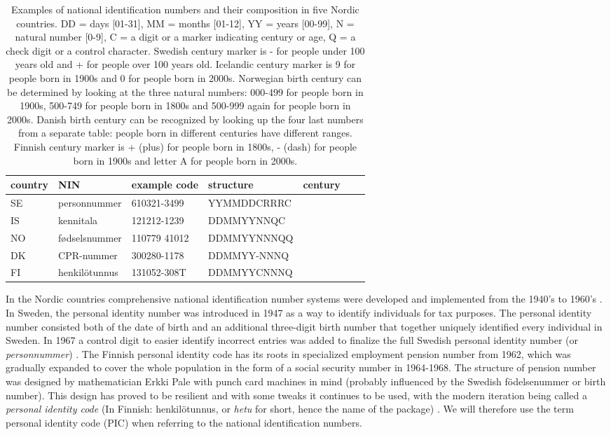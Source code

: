 \begin{table}[ht]
\centering
\begin{tabular}{lllllll}
\toprule
  country & NIN & example code & structure & century \\
  \hline
  SE & personnummer & 610321-3499 & YYMMDDCRRRC \\
  IS & kennitala & 121212-1239 & DDMMYYNNQC \\
  NO & fødselsnummer & 110779 41012 & DDMMYYNNNQQ \\
  DK & CPR-nummer & 300280-1178 & DDMMYY-NNNQ \\
  FI & henkilötunnus & 131052-308T & DDMMYYCNNNQ \\
\bottomrule
\end{tabular}
\caption{Examples of national identification numbers and their composition in five Nordic countries. DD = days [01-31], MM = months [01-12], YY = years [00-99], N = natural number [0-9], C = a digit or a marker indicating century or age, Q = a check digit or a control character. Swedish century marker is - for people under 100 years old and + for people over 100 years old. Icelandic century marker is 9 for people born in 1900s and 0 for people born in 2000s. Norwegian birth century can be determined by looking at the three natural numbers: 000-499 for people born in 1900s, 500-749 for people born in 1800s and 500-999 again for people born in 2000s. Danish birth century can be recognized by looking up the four last numbers from a separate table: people born in different centuries have different ranges. Finnish century marker is + (plus) for people born in 1800s, - (dash) for people born in 1900s and letter A for people born in 2000s.}
\label{tab:nordiccomparison2}
\end{table}

In the Nordic countries comprehensive national identification number systems were developed and implemented from the 1940's to 1960's \citep{watson2010}. In Sweden, the personal identity number was introduced in 1947 as a way to identify individuals for tax purposes. The personal identity number consisted both of the date of birth and an additional three-digit birth number that together uniquely identified every individual in Sweden. In 1967 a control digit to easier identify incorrect entries was added to finalize the full Swedish personal identity number (or \emph{personnummer}) \citep{johansson2003,scb2016}. The Finnish personal identity code has its roots in specialized employment pension number from 1962, which was gradually expanded to cover the whole population in the form of a social security number in 1964-1968. The structure of pension number was designed by mathematician Erkki Pale with punch card machines in mind (probably influenced by the Swedish födelsenummer or birth number). This design has proved to be resilient and with some tweaks it continues to be used, with the modern iteration being called a \emph{personal identity code} (In Finnish: henkilötunnus, or \emph{hetu} for short, hence the name of the package) \citep{salste2021}. We will therefore use the term personal identity code (PIC) when referring to the national identification numbers.

